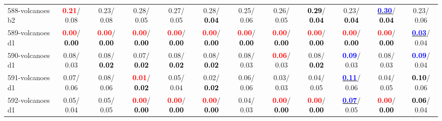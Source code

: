\begin{table}[h]
\begin{center}
{\begin{tabular}{lc|c|c|c|c|c|c|c|c|c|c}
588-volcanoes b2 & \textcolor{red}{\textbf{  0.21}}/  0.08 &   0.23/  0.08 &   0.28/  0.05 &   0.27/  0.05 &   0.28/\textcolor{black}{\textbf{  0.04}} &   0.25/  0.06 &   0.26/  0.05 & \textcolor{black}{\textbf{  0.29}}/\textcolor{black}{\textbf{  0.04}} &   0.23/\textcolor{black}{\textbf{  0.04}} & \underline{\textcolor{blue}{\textbf{  0.30}}}/\textcolor{black}{\textbf{  0.04}} &   0.23/  0.06 \\
589-volcanoes d1 & \textcolor{red}{\textbf{  0.00}}/\textcolor{black}{\textbf{  0.00}} & \textcolor{red}{\textbf{  0.00}}/\textcolor{black}{\textbf{  0.00}} & \textcolor{red}{\textbf{  0.00}}/\textcolor{black}{\textbf{  0.00}} & \textcolor{red}{\textbf{  0.00}}/\textcolor{black}{\textbf{  0.00}} & \textcolor{red}{\textbf{  0.00}}/\textcolor{black}{\textbf{  0.00}} & \textcolor{red}{\textbf{  0.00}}/\textcolor{black}{\textbf{  0.00}} & \textcolor{red}{\textbf{  0.00}}/\textcolor{black}{\textbf{  0.00}} & \textcolor{red}{\textbf{  0.00}}/\textcolor{black}{\textbf{  0.00}} & \textcolor{red}{\textbf{  0.00}}/\textcolor{black}{\textbf{  0.00}} & \textcolor{red}{\textbf{  0.00}}/\textcolor{black}{\textbf{  0.00}} & \underline{\textcolor{blue}{\textbf{  0.03}}}/  0.04 \\
590-volcanoes d1 &   0.08/  0.03 &   0.08/\textcolor{black}{\textbf{  0.02}} &   0.07/\textcolor{black}{\textbf{  0.02}} &   0.08/\textcolor{black}{\textbf{  0.02}} &   0.08/\textcolor{black}{\textbf{  0.02}} &   0.08/  0.03 & \textcolor{red}{\textbf{  0.06}}/  0.03 &   0.08/\textcolor{black}{\textbf{  0.02}} & \textcolor{blue}{\textbf{  0.09}}/  0.03 &   0.08/  0.03 & \textcolor{blue}{\textbf{  0.09}}/  0.04 \\ \hline
591-volcanoes d1 &   0.07/  0.06 &   0.08/  0.06 & \textcolor{red}{\textbf{  0.01}}/\textcolor{black}{\textbf{  0.02}} &   0.05/  0.04 &   0.02/\textcolor{black}{\textbf{  0.02}} &   0.06/  0.06 &   0.03/  0.03 &   0.04/  0.05 & \underline{\textcolor{blue}{\textbf{  0.11}}}/  0.06 &   0.04/  0.05 & \textcolor{black}{\textbf{  0.10}}/  0.06 \\
592-volcanoes d1 &   0.05/  0.04 &   0.05/  0.05 & \textcolor{red}{\textbf{  0.00}}/\textcolor{black}{\textbf{  0.00}} & \textcolor{red}{\textbf{  0.00}}/\textcolor{black}{\textbf{  0.00}} & \textcolor{red}{\textbf{  0.00}}/\textcolor{black}{\textbf{  0.00}} &   0.04/  0.03 & \textcolor{red}{\textbf{  0.00}}/\textcolor{black}{\textbf{  0.00}} & \textcolor{red}{\textbf{  0.00}}/\textcolor{black}{\textbf{  0.00}} & \underline{\textcolor{blue}{\textbf{  0.07}}}/  0.05 & \textcolor{red}{\textbf{  0.00}}/\textcolor{black}{\textbf{  0.00}} & \textcolor{black}{\textbf{  0.06}}/  0.04 \\

\end{tabular}}
\end{center}
\end{table}
